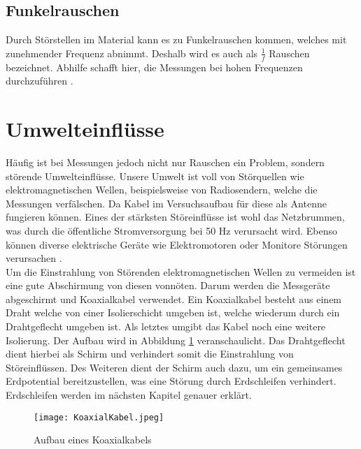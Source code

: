 \subsection{Funkelrauschen}
Durch Störstellen im Material kann es zu Funkelrauschen kommen, welches mit zunehmender Frequenz abnimmt. Deshalb wird es auch als $\frac{1}{f}$ Rauschen bezeichnet. Abhilfe schafft hier, die Messungen bei hohen Frequenzen durchzuführen \citep{VA}.

\newpage
\section{Umwelteinflüsse}
Häufig ist bei Messungen jedoch nicht nur Rauschen ein Problem, sondern störende Umwelteinflüsse. Unsere Umwelt ist voll von Störquellen wie elektromagnetischen Wellen, beispielsweise von Radiosendern, welche die Messungen verfälschen. Da Kabel im Versuchsaufbau für diese als Antenne fungieren können. Eines der stärksten Störeinflüsse ist wohl das Netzbrummen, was durch die öffentliche Stromversorgung bei 50 Hz verursacht wird. Ebenso können diverse elektrische Geräte wie Elektromotoren oder Monitore Störungen verursachen \citep{VA}.\\

Um die Einstrahlung von Störenden elektromagnetischen Wellen zu vermeiden ist eine gute Abschirmung von diesen vonnöten.
Darum werden die Messgeräte abgeschirmt und Koaxialkabel verwendet. Ein Koaxialkabel besteht aus einem Draht welche von einer Isolierschicht umgeben ist, welche wiederum durch ein Drahtgeflecht umgeben ist. Als letztes umgibt das Kabel noch eine weitere Isolierung. Der Aufbau wird in Abbildung \ref{fig:Koaxialkabel} veranschaulicht. Das Drahtgeflecht dient hierbei als Schirm und verhindert somit die Einstrahlung von Störeinflüssen. Des Weiteren dient der Schirm auch dazu, um ein gemeinsames Erdpotential bereitzustellen, was eine Störung durch Erdschleifen verhindert. Erdschleifen werden im nächsten Kapitel genauer erklärt.

\begin{figure}[h]
    \centering
    \texttt{[image: KoaxialKabel.jpeg]}
    \caption{Aufbau eines Koaxialkabels \citep{VA}}
    \label{fig:Koaxialkabel}
\end{figure}

\newpage
